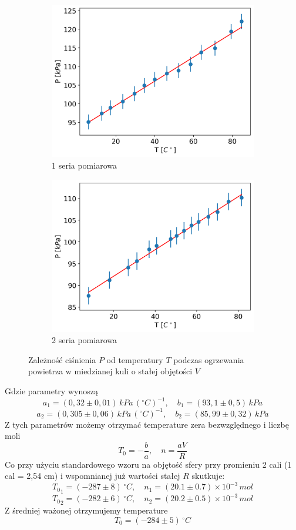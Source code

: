 \documentclass[12pt]{article}
\begin{document}
\begin{figure}[H]
    \centering
    \begin{subfigure}{0.47\textwidth}
        \includegraphics[width=\linewidth]{izohoric_0}
        \caption{1 seria pomiarowa}
    \end{subfigure}\hfill
    \begin{subfigure}{0.47\textwidth}
        \includegraphics[width=\linewidth]{izohoric_1}
        \caption{2 seria pomiarowa}
    \end{subfigure}
    \caption{Zależność ciśnienia \(P\) od temperatury \(T\) podczas ogrzewania powietrza w miedzianej kuli o stałej objętości \(V\)}
    \label{fig:izohoric}
\end{figure}
Gdzie parametry wynoszą
\[
    a_1 = (0{,}32 \pm 0{,}01) \, kPa \, (^\circ C)^{-1}, \quad b_1 = (93{,}1 \pm 0{,}5) \, kPa
\]
\[
    a_2 = (0{,}305 \pm 0{,}06)  \, kPa \, (^\circ C)^{-1}, \quad b_2 = (85{,}99 \pm 0{,}32) \, kPa
\]
Z tych parametrów możemy otrzymać temperature zera bezwzględnego i liczbę moli
\[
    T_0 = -\frac{b}{a}, \quad n = \frac{aV}{R}
\]
Co przy użyciu standardowego wzoru na objętość sfery przy promieniu 2 cali (1 cal = 2{,}54 cm) i wspomnianej już wartości stałej \(R\) skutkuje:
\[
    {T_0}_1 = (-287 \pm 8) \, ^\circ C, \quad n_1 = (20.1 \pm 0.7) \times 10^{-3} \, mol
\]
\[
    {T_0}_2 = (-282 \pm 6) \, ^\circ C, \quad n_2 = (20.2 \pm 0.5) \times 10^{-3} \, mol
\]
Z średniej ważonej otrzymujemy temperature
\[
    T_0 = (-284 \pm 5) \, ^\circ C
\]
\end{document}
